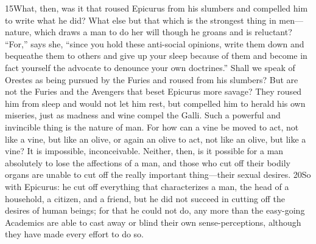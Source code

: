 15What, then, was it that roused Epicurus from his slumbers and compelled him to write what he did? What else but that which is the strongest thing in men—nature, which draws a man to do her will though he groans and is reluctant? ``For,'' says she, ``since you hold these anti-social opinions, write them down and bequeathe them to others and give up your sleep because of them and become in fact yourself the advocate to denounce your own doctrines.'' Shall we speak of Orestes as being pursued by the Furies and roused from his slumbers? But are not the Furies and the Avengers that beset Epicurus more savage? They roused him from sleep and would not let him rest, but compelled him to herald his own miseries, just as madness and wine compel the Galli. Such a powerful and invincible thing is the nature of man. For how can a vine be moved to act, not like a vine, but like an olive, or again an olive to act, not like an olive, but like a vine? It is impossible, inconceivable. Neither, then, is it possible for a man absolutely to lose the affections of a man, and those who cut off their bodily organs are unable to cut off the really important thing—their sexual desires. 20So with Epicurus: he cut off everything that characterizes a man, the head of a household, a citizen, and a friend, but he did not succeed in cutting off the desires of human beings; for that he could not do, any more than the easy-going Academics are able to cast away or blind their own sense-perceptions, although they have made every effort to do so.

